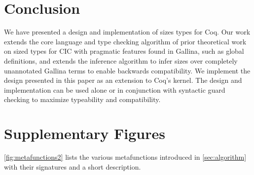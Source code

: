 \documentclass[nonacm,screen,10pt]{acmart}
\begin{document}
\section{Conclusion}
\label{sec:conclusion}
We have presented a design and implementation of sizes types for Coq.
Our work extends the core language and type checking algorithm of prior theoretical work on sized types for CIC with pragmatic features found in Gallina, such as global definitions, and extends the inference algorithm to infer sizes over completely unannotated Gallina terms to enable backwards compatibility. We implement the design presented in this paper as an extension to Coq's kernel\cite{impl}. The design and implementation can be used alone or in conjunction with syntactic guard checking to maximize typeability and compatibility.




\appendix

\section{Supplementary Figures}\label{sec:figures}



\autoref{fig:metafunctions2} lists the various metafunctions introduced in \autoref{sec:algorithm} with their signatures and a short description.

%
\end{document}
